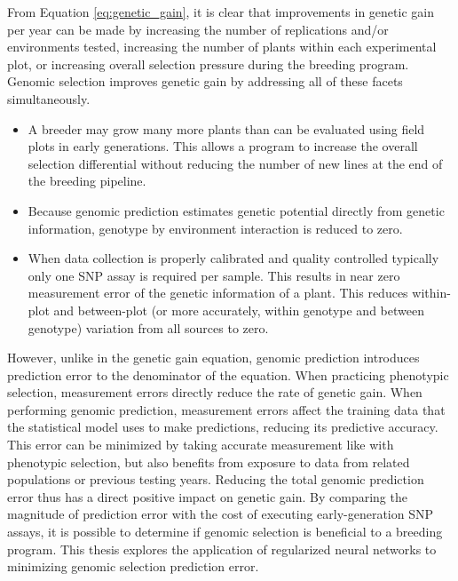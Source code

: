 From Equation \ref{eq:genetic_gain}, it is clear that improvements in genetic gain per year can
be made by increasing the number of replications and/or environments tested, increasing the 
number of plants within each experimental plot, or increasing overall selection pressure 
during the breeding program. Genomic selection improves genetic gain by addressing 
all of these facets simultaneously.

\begin{itemize}
    \item A breeder may grow many more plants than can be evaluated using field plots in 
          early generations. This allows a program to increase the overall selection 
          differential without reducing the number of new lines at the end of the breeding pipeline.
    \item Because genomic prediction estimates genetic potential directly from genetic information,
          genotype by environment interaction is reduced to zero.
    \item When data collection is properly calibrated and quality controlled typically only one
          SNP assay is required per sample. This results in near zero measurement error of the 
          genetic information of a plant. This reduces within-plot and between-plot 
          (or more accurately, within genotype and between genotype) variation from all sources to zero.
\end{itemize}

However, unlike in the genetic gain equation, genomic prediction introduces prediction error to 
the denominator of the equation. When practicing phenotypic selection, measurement errors 
directly reduce the rate of genetic gain. When performing genomic prediction, measurement errors 
affect the training data that the statistical model uses to make predictions, reducing its predictive 
accuracy. This error can be minimized by taking accurate measurement like with phenotypic selection, 
but also benefits from exposure to data from related populations or previous testing years. 
Reducing the total genomic prediction error thus has a direct positive impact on genetic gain. 
By comparing the magnitude of prediction error with the cost of executing early-generation 
SNP assays, it is possible to determine if genomic selection is beneficial to a breeding 
program. This thesis explores the application of regularized neural networks to 
minimizing genomic selection prediction error.

